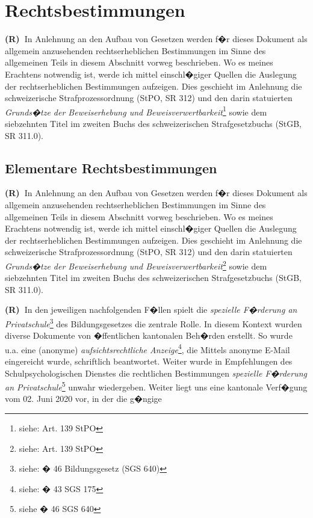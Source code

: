 \documentclass[paper=a4,fontsize=12pt, oneside, numbers=noenddot]{scrbook}
\newcounter{rz}
\newcommand{\Rz}{\addtocounter{rz}{1}\textbf{(R\arabic{rz})~}}
\begin{document}
	
	
	
	\clearpairofpagestyles %
	\chead{\headmark} %
	\cfoot*{\pagemark} %
	
	
	\tableofcontents
	\chapter{Rechtsbestimmungen}
		\Rz In Anlehnung an den Aufbau von Gesetzen werden f�r dieses Dokument als allgemein anzusehenden rechtserheblichen Bestimmungen im Sinne des allgemeinen Teils in diesem Abschnitt vorweg beschrieben. Wo es meines Erachtens notwendig ist, werde ich mittel einschl�giger Quellen die Auslegung der rechtserheblichen Bestimmungen aufzeigen. Dies geschieht im Anlehnung die schweizerische Strafprozessordnung (StPO, SR 312) und den darin statuierten \textit{Grunds�tze der Beweiserhebung und Beweisverwertbarkeit}\footnote{siehe: Art. 139 StPO} sowie dem siebzehnten Titel im zweiten Buchs des schweizerischen Strafgesetzbuchs (StGB, SR 311.0).
	
	
	\section{Elementare Rechtsbestimmungen}
	\Rz In Anlehnung an den Aufbau von Gesetzen werden f�r dieses Dokument als allgemein anzusehenden rechtserheblichen Bestimmungen im Sinne des allgemeinen Teils in diesem Abschnitt vorweg beschrieben. Wo es meines Erachtens notwendig ist, werde ich mittel einschl�giger Quellen die Auslegung der rechtserheblichen Bestimmungen aufzeigen. Dies geschieht im Anlehnung die schweizerische Strafprozessordnung (StPO, SR 312) und den darin statuierten \textit{Grunds�tze der Beweiserhebung und Beweisverwertbarkeit}\footnote{siehe: Art. 139 StPO} sowie dem siebzehnten Titel im zweiten Buchs des schweizerischen Strafgesetzbuchs (StGB, SR 311.0).
	
	
	
	\Rz In den jeweiligen nachfolgenden F�llen spielt die \textit{spezielle F�rderung an Privatschule}\footnote{siehe: � 46 Bildungsgesetz (SGS 640)}  des Bildungsgesetzes die zentrale Rolle. In diesem Kontext wurden diverse Dokumente von �ffentlichen kantonalen Beh�rden erstellt. So wurde u.a. eine (anonyme) \textit{aufsichtsrechtliche Anzeige}\footnote{siehe: � 43 SGS 175}, die Mittels anonyme E-Mail eingereicht wurde, schriftlich beantwortet. Weiter wurde in Empfehlungen des Schulpsychologischen Dienstes die rechtlichen Bestimmungen \textit{spezielle F�rderung an Privatschule}\footnote{siehe � 46 SGS 640} unwahr wiedergeben. Weiter liegt uns eine kantonale Verf�gung vom 02. Juni 2020 vor, in der die g�ngige 
	
\end{document}
